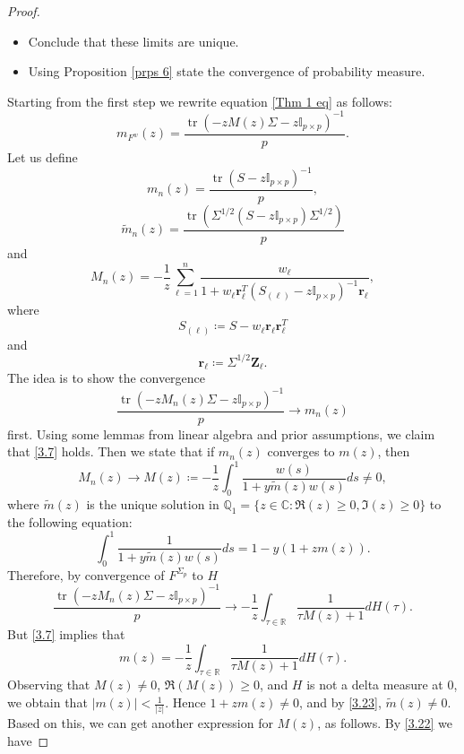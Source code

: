 \documentclass[a4paper,11pt]{book}
\theoremstyle{plain}
\theoremstyle{definition}
\newcommand{\MR}{\mathbb{R}}
\newcommand{\tr}{\operatorname{tr}}
\begin{document}
\begin{proof}
\begin{itemize}
    		\item Conclude that these limits are unique.
    		\item Using Proposition \ref{prps 6} state the convergence of probability measure.
    	\end{itemize}
    	Starting from the first step we rewrite equation \eqref{Thm 1 eq} as follows:
    	\[ m_{F^w}(z) = \frac{\tr(-zM(z)\Sigma -z\mathbb{I}_{p \times p})^{-1}}{p}. \]
    	Let us define
    	\[ m_n(z) = \frac{\tr(S-z\mathbb{I}_{p \times p})^{-1}}{p}, \]
    	\[ \widetilde{m}_n(z) = \frac{ \tr(\Sigma^{1/2} (S-z \mathbb{I}_{p \times p}) \Sigma^{1/2})  }{p} \]
    	and
    	\[ M_n(z) = -\frac{1}{z} \sum_{\ell=1}^{n} \frac{w_\ell}{ 1+w_\ell \mathbf{r}_\ell^T (S_{(\ell)}-z\mathbb{I}_{p \times p})^{-1} \mathbf{r}_\ell},  \]
    	where
    	\[ S_{(\ell)} \coloneqq S - w_\ell \mathbf{r}_\ell \mathbf{r}_\ell^T \]
    	and 
    	\[ \mathbf{r}_\ell \coloneqq \Sigma^{1/2}\mathbf{Z}_\ell. \]
    	The idea is to show the convergence
    	\begin{equation} \label{3.7}
    	     \frac{\tr(-zM_n(z)\Sigma -z\mathbb{I}_{p \times p})^{-1}  }{p} \rightarrow m_n(z)
    	\end{equation}
    	first. Using some lemmas from linear algebra and prior assumptions, we claim that \eqref{3.7} holds. Then we state that if $m_n(z)$ converges to $m(z)$, then
    	\begin{equation} \label{3.22}
    	 M_n(z) \rightarrow M(z) \coloneqq -\frac{1}{z} \int_{0}^{1} \frac{w(s)}{1+y\widetilde{m}(z)w(s) }ds \neq 0, 
    	\end{equation}
    	where $\widetilde{m}(z)$ is the unique solution in $\mathbb{Q}_1 = \{z \in \mathbb{C}: \Re(z) \geq 0, \Im(z) \geq 0\}$ to the following equation:
    	\begin{equation} \label{3.23}
    	\int_{0}^{1} \frac{1}{1 + y \widetilde{m}(z) w(s)} ds = 1 - y (1 + zm(z)).
    	\end{equation}
    	Therefore, by convergence of $F^{\Sigma_p}$ to $H$
    	\[ 
    	\frac{\tr(-zM_n(z)\Sigma -z\mathbb{I}_{p \times p})^{-1}  }{p} \rightarrow -\frac{1}{z} \int_{\tau \in \MR} \frac{1}{\tau M(z) + 1}dH(\tau). \]
    	But \eqref{3.7} implies that
    	\begin{equation} \label{3.27}
    		m(z) = -\frac{1}{z} \int_{\tau \in \MR} \frac{1}{\tau M(z) + 1}dH(\tau). 
    	\end{equation}
    	Observing that $M(z) \neq 0$, $\Re(M(z)) \geq 0$, and $H$ is not a delta measure at $0$, we obtain that $|m(z)| < \frac{1}{|z|}$. Hence $1+zm(z) \neq 0$, and by \eqref{3.23}, $\widetilde{m}(z) \neq 0$. Based on this, we can get another expression for $M(z)$, as follows. By \eqref{3.22} we have

\end{proof}
\end{document}
